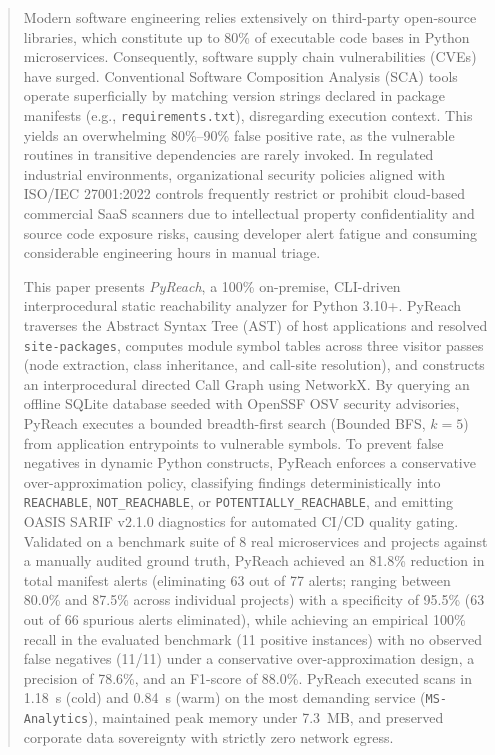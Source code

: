 \documentclass[conference]{IEEEtran}
\begin{document}
\renewcommand{\abstractname}{Abstract}
\renewcommand{\IEEEkeywordsname}{Index Terms}
\begin{abstract}
Modern software engineering relies extensively on third-party open-source libraries, which constitute up to 80\% of executable code bases in Python microservices. Consequently, software supply chain vulnerabilities (CVEs) have surged. Conventional Software Composition Analysis (SCA) tools operate superficially by matching version strings declared in package manifests (e.g., \texttt{requirements.txt}), disregarding execution context. This yields an overwhelming 80\%--90\% false positive rate, as the vulnerable routines in transitive dependencies are rarely invoked. In regulated industrial environments, organizational security policies aligned with ISO/IEC 27001:2022 controls frequently restrict or prohibit cloud-based commercial SaaS scanners due to intellectual property confidentiality and source code exposure risks, causing developer alert fatigue and consuming considerable engineering hours in manual triage.

This paper presents \textit{PyReach}, a 100\% on-premise, CLI-driven interprocedural static reachability analyzer for Python 3.10+. PyReach traverses the Abstract Syntax Tree (AST) of host applications and resolved \texttt{site-packages}, computes module symbol tables across three visitor passes (node extraction, class inheritance, and call-site resolution), and constructs an interprocedural directed Call Graph using NetworkX. By querying an offline SQLite database seeded with OpenSSF OSV security advisories, PyReach executes a bounded breadth-first search (Bounded BFS, $k=5$) from application entrypoints to vulnerable symbols. To prevent false negatives in dynamic Python constructs, PyReach enforces a conservative over-approximation policy, classifying findings deterministically into \texttt{REACHABLE}, \texttt{NOT\_REACHABLE}, or \texttt{POTENTIALLY\_REACHABLE}, and emitting OASIS SARIF v2.1.0 diagnostics for automated CI/CD quality gating. Validated on a benchmark suite of 8 real microservices and projects against a manually audited ground truth, PyReach achieved an 81.8\% reduction in total manifest alerts (eliminating 63 out of 77 alerts; ranging between 80.0\% and 87.5\% across individual projects) with a specificity of 95.5\% (63 out of 66 spurious alerts eliminated), while achieving an empirical 100\% recall in the evaluated benchmark (11 positive instances) with no observed false negatives (11/11) under a conservative over-approximation design, a precision of 78.6\%, and an F1-score of 88.0\%. PyReach executed scans in 1.18~s (cold) and 0.84~s (warm) on the most demanding service (\texttt{MS-Analytics}), maintained peak memory under 7.3~MB, and preserved corporate data sovereignty with strictly zero network egress.
\end{abstract}
\end{document}
